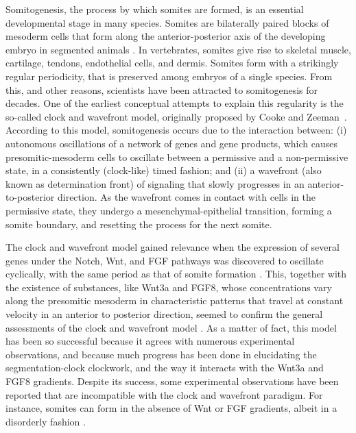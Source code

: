 \documentclass[%
 preprint,
 amsmath,amssymb,
 aps,
]{revtex4-2}
\begin{document}
	Somitogenesis, the process by which somites are formed, is an essential
	developmental stage in many species. Somites are bilaterally paired blocks of
	mesoderm cells that form along the anterior-posterior axis of the developing
	embryo in segmented animals \citep{Maroto2012}. In vertebrates, somites give
	rise to skeletal muscle, cartilage, tendons, endothelial cells, and dermis.
	Somites form with a strikingly regular periodicity, that is preserved among
	embryos of a single species. From this, and other reasons, scientists have been
	attracted to somitogenesis for decades. One of the earliest conceptual attempts
	to explain this regularity is the so-called clock and wavefront model,
	originally proposed by Cooke and Zeeman~\citep{Cooke1976}. According to this model, somitogenesis
	occurs due to the interaction between: (i) autonomous oscillations of a network
	of genes and gene products, which causes presomitic-mesoderm cells to oscillate
	between a permissive and a non-permissive state, in a consistently (clock-like)
	timed fashion; and (ii) a wavefront (also known as determination front) of
	signaling that slowly progresses in an anterior-to-posterior direction. As the
	wavefront comes in contact with cells in the permissive state, they undergo a
	mesenchymal-epithelial transition, forming a somite boundary, and resetting the
	process for the next somite.
	
	The clock and wavefront model gained relevance when the expression of several
	genes under the Notch, Wnt, and FGF pathways was discovered to oscillate
	cyclically, with the same period as that of somite formation
	\citep{Palmeirim1997, Pourquie2001, Gibb2010, Pourquie2011}. This, together with
	the existence of substances, like Wnt3a and FGF8, whose concentrations
	vary along the presomitic mesoderm in characteristic patterns that travel at
	constant velocity in an anterior to posterior direction, seemed to confirm the
	general assessments of the clock and wavefront model \citep{Dubrulle2001,
		Gibb2010, Pourquie2011}. As a matter of fact, this model has been so
	successful because it agrees with numerous experimental observations, and
	because much progress has been done in elucidating the segmentation-clock
	clockwork, and the way it interacts with the Wnt3a and FGF8 gradients.
	Despite its success, some experimental observations have been reported that are
	incompatible with the clock and wavefront paradigm. For instance, somites can
	form in the absence of Wnt or FGF gradients, albeit in a disorderly
	fashion \citep{Naiche2011,Dias2014}.
	
\end{document}
